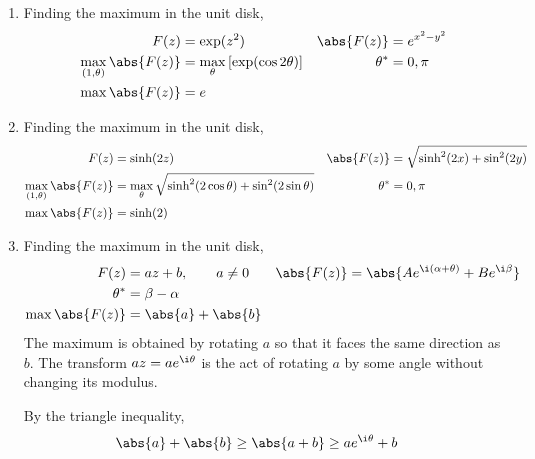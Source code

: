 \begin{enumerate}
    \item Finding the maximum in the unit disk,
          \begin{align}
              F(z)                        & = \exp(z^2)                         &
              \abs{F(z)}                  & = e^{x^2 - y^2}                       \\
              \max_{(1,\theta)}\abs{F(z)} & = \max_\theta{[\exp(\cos 2\theta)]} &
              \theta^*                    & = 0, \pi                              \\
              \max{\abs{F(z)}}            & = e
          \end{align}

    \item Finding the maximum in the unit disk,
          \begin{align}
              F(z)                        & = \sinh(2z)                              &
              \abs{F(z)}                  & = \sqrt{\sinh^2(2x) + \sin^2(2y)}          \\
              \max_{(1,\theta)}\abs{F(z)} & = \max_\theta{\sqrt{\sinh^2(2\cos\theta)
              + \sin^2(2\sin\theta)}}     &
              \theta^*                    & = 0, \pi                                   \\
              \max{\abs{F(z)}}            & = \sinh(2)
          \end{align}

    \item Finding the maximum in the unit disk,
          \begin{align}
              F(z)             & = az + b, \qquad a \neq 0          &
              \abs{F(z)}       & = \abs{A e^{\i(\alpha + \theta)} +
              B e^{\i \beta}}                                         \\
              \theta^*         & = \beta - \alpha                     \\
              \max{\abs{F(z)}} & = \abs{a} + \abs{b}
          \end{align}
          The maximum is obtained by rotating $ a $ so that it faces the same direction
          as $ b $. The transform $ az = ae^{\i \theta} $ is the act of rotating $ a $
          by some angle without changing its modulus. \par
          By the triangle inequality,
          \begin{align}
              \abs{a} + \abs{b} & \geq \abs{a + b} \geq {ae^{\i \theta} + b}
          \end{align}


\end{enumerate}
